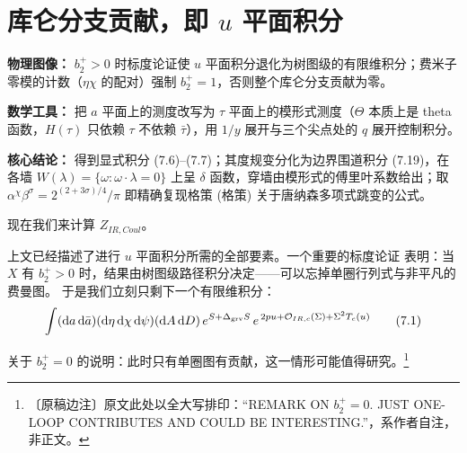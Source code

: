 \section{库仑分支贡献，即 $u$ 平面积分}

\begin{keytakeaways}
\item \textbf{物理图像：} $b_2^{+}>0$ 时标度论证使 $u$ 平面积分退化为树图级的有限维积分；费米子零模的计数（$\eta\chi$ 的配对）强制 $b_2^{+}=1$，否则整个库仑分支贡献为零。
\item \textbf{数学工具：} 把 $a$ 平面上的测度改写为 $\tau$ 平面上的模形式测度（$\Theta$ 本质上是 theta 函数，$H(\tau)$ 只依赖 $\tau$ 不依赖 $\bar\tau$），用 $1/y$ 展开与三个尖点处的 $q$ 展开控制积分。
\item \textbf{核心结论：} 得到显式积分 (7.6)--(7.7)；其度规变分化为边界围道积分 (7.19)，在各墙 $W(\lambda)=\{\omega:\omega\cdot\lambda=0\}$ 上呈 $\delta$ 函数，穿墙由模形式的傅里叶系数给出；取 $\alpha^{\chi}\beta^{\sigma}=2^{(2+3\sigma)/4}/\pi$ 即精确复现格策 (格策) 关于唐纳森多项式跳变的公式。
\end{keytakeaways}

现在我们来计算 $Z_{IR,Coul}$。

上文已经描述了进行 $u$ 平面积分所需的全部要素。一个重要的标度论证 \cite{ref38} 表明：当 $X$ 有 $b_2^{+}>0$ 时，结果由树图级路径积分决定——可以忘掉单圈行列式与非平凡的费曼图。
于是我们立刻只剩下一个有限维积分：
\begin{equation}
\int(\mathrm{d} a\,\mathrm{d}\bar a)(\mathrm{d}\eta\,\mathrm{d}\chi\,\mathrm{d}\psi)(\mathrm{d} A\,\mathrm{d} D)\,
e^{S+\Delta_{\mathrm{grv}}S}\,
e^{\,2pu+\mathcal{O}_{IR,c}(\Sigma)+\Sigma^{2}T_c(u)}
\tag{7.1}
\end{equation}

\begin{center}
\begin{minipage}{0.92\linewidth}
\small 关于 $b_2^{+}=0$ 的说明：此时只有单圈图有贡献，这一情形可能值得研究。\footnote{〔原稿边注〕原文此处以全大写排印：“REMARK ON $b_2^{+}=0$. JUST ONE-LOOP CONTRIBUTES AND COULD BE INTERESTING.”，系作者自注，非正文。}
\end{minipage}
\end{center}

